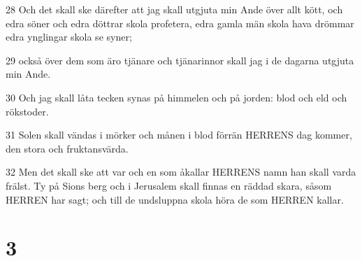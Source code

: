 \par 28 Och det skall ske därefter att jag skall utgjuta min Ande över allt kött, och edra söner och edra döttrar skola profetera, edra gamla män skola hava drömmar edra ynglingar skola se syner;
\par 29 också över dem som äro tjänare och tjänarinnor skall jag i de dagarna utgjuta min Ande.
\par 30 Och jag skall låta tecken synas på himmelen och på jorden: blod och eld och rökstoder.
\par 31 Solen skall vändas i mörker och månen i blod förrän HERRENS dag kommer, den stora och fruktansvärda.
\par 32 Men det skall ske att var och en som åkallar HERRENS namn han skall varda frälst. Ty på Sions berg och i Jerusalem skall finnas en räddad skara, såsom HERREN har sagt; och till de undsluppna skola höra de som HERREN kallar.

\chapter{3}

